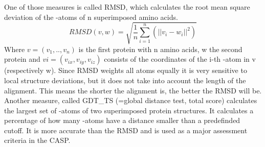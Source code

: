 \documentclass[]{article}
\begin{document}
\noindent One of those measures is called RMSD, which calculates the root mean square deviation of the -atoms of n superimposed amino acids. \newline
\begin{displaymath}
	RMSD(v,w)=\sqrt{\frac{1}{n}\sum_{i=1}^{n}(||v_i-w_i||^2)}
\end{displaymath}
Where $v = (v_1,..,v_n)$ is the first protein with n amino acids, w the second protein and $vi = (v_{ix}, v_{iy}, v_{iz})$ consists of the coordinates of the i-th -atom in v (respectively w). \newline
Since RMSD weights all atoms equally it is very sensitive to local structure deviations, but it does not take into account the length of the alignment. This means the shorter the alignment is, the better the RMSD will be. \newline
\newline
Another measure, called GDT\_TS (=global distance test, total score) calculates the largest set of -atoms of two superimposed protein structures. It calculates a percentage of how many -atoms have a distance smaller than a predefinded cutoff. \newline
It is more accurate than the RMSD and is used as a major assessment criteria in the CASP.\newline
\end{document}
